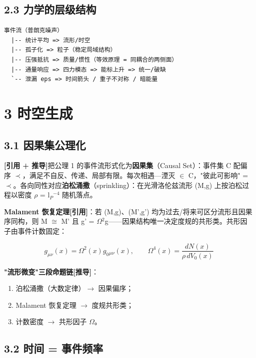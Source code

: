\documentclass[12pt]{article}
\newcommand{\mtag}[1]{\textbf{[#1]}}
\newcommand{\up}[1]{\ensuremath{^{#1}}}
\newcommand{\down}[1]{\ensuremath{_{#1}}}
\begin{document}
\subsection{2.3 力学的层级结构}

\begin{verbatim}
事件流（普朗克噪声）
  |-- 统计平均 => 流形/时空
  |-- 孤子化 => 粒子（稳定局域结构）
  |-- 压强抵抗 => 质量/惯性（等效原理 = 同耦合的两侧面）
  |-- 通量响应 => 四力模态 => 能标上升 => 统一/破缺
  `-- 泄漏 eps => 时间箭头 / 重子不对称 / 暗能量
\end{verbatim}



\section{3 时空生成}

\subsection{3.1 因果集公理化}

\mtag{引用 + 推导}把公理 1 的事件流形式化为\textbf{因果集}（Causal Set）：事件集 C 配偏序 \ensuremath{\prec}，满足不自反、传递、局部有限。每次相遇---湮灭 \ensuremath{\in} C，"彼此可影响" = \ensuremath{\prec}。各向同性对应\textbf{泊松涌撒}（sprinkling）：在光滑洛伦兹流形 (M,g) 上按泊松过程以密度 \ensuremath{\rho} = l\down{P}\up{-4} 随机落点。

\textbf{Malament 恢复定理}\mtag{引用}：若 (M,g)、(M',g') 均为过去/将来可区分流形且因果序同构，则 M \ensuremath{\cong} M' 且 g' = \ensuremath{\Omega}\up{2}g------因果结构唯一决定度规的共形类。共形因子由事件计数固定：

\[g_{\mu\nu}(x) = \Omega^2(x)g_0{}_{\mu\nu}(x),\qquad \Omega^4(x) = \frac{dN(x)}{\rho\,dV_0(x)}\]

\textbf{"流形微变"三段命题链}\mtag{推导}：
\begin{enumerate}
\item 泊松涌撒（大数定律）\ensuremath{\to} 因果偏序；
\item Malament 恢复定理 \ensuremath{\to} 度规共形类；
\item 计数密度 \ensuremath{\to} 共形因子 \ensuremath{\Omega}。
\end{enumerate}

\subsection{3.2 时间 = 事件频率}
\end{document}
